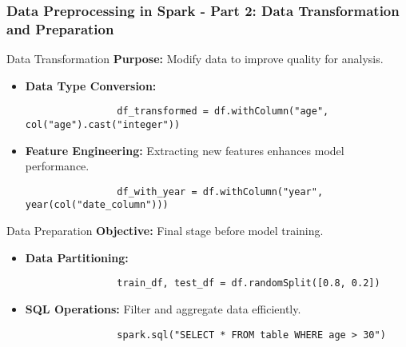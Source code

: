 \documentclass[aspectratio=169]{beamer}
\begin{document}
\begin{frame}[fragile]
    \frametitle{Data Preprocessing in Spark - Part 2: Data Transformation and Preparation}
    \begin{block}{Data Transformation}
        \textbf{Purpose:} Modify data to improve quality for analysis.
        \begin{itemize}
            \item \textbf{Data Type Conversion:}
                \begin{lstlisting}
                df_transformed = df.withColumn("age", col("age").cast("integer"))
                \end{lstlisting}
            \item \textbf{Feature Engineering:} Extracting new features enhances model performance.
                \begin{lstlisting}
                df_with_year = df.withColumn("year", year(col("date_column")))
                \end{lstlisting}
        \end{itemize}
    \end{block}

    \begin{block}{Data Preparation}
        \textbf{Objective:} Final stage before model training.
        \begin{itemize}
            \item \textbf{Data Partitioning:}
                \begin{lstlisting}
                train_df, test_df = df.randomSplit([0.8, 0.2])
                \end{lstlisting}
            \item \textbf{SQL Operations:} Filter and aggregate data efficiently.
                \begin{lstlisting}
                spark.sql("SELECT * FROM table WHERE age > 30")
                \end{lstlisting}
        \end{itemize}
    \end{block}
\end{frame}
\end{document}
